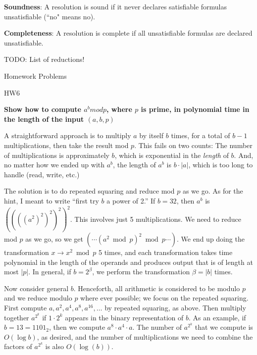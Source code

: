 \documentclass[2pt]{scrartcl}
\makeatletter
\renewcommand{\section}{\@startsection{section}{1}{0mm}
  {-1ex plus -.5ex minus -.2ex}
  {0.5ex plus .2ex}
{\normalfont\large\bfseries}}
\renewcommand{\subsection}{\@startsection{subsection}{2}{0mm}
  {-1explus -.5ex minus -.2ex}
  {0.5ex plus .2ex}
{\normalfont\normalsize\bfseries}}
\makeatother
\begin{document}
\begin{multicols}{6}
  {\bf Soundness}: A resolution is sound if it never declares satisfiable formulas unsatisfiable (``no" means no).

  {\bf Completeness}: A resolution is complete if all unsatisfiable formulas are declared unsatisfiable.

  TODO: List of reductions!

  \section{Homework Problems}

  \subsection{HW6}

  {\bf Show how to compute $a^b mod p$, where $p$ is prime, in polynomial time in the length of the input $(a, b, p)$}

  A straightforward approach is to multiply $a$ by itself $b$
  times, for a total of $b-1$ multiplications, then take the result mod
  $p$.  This fails on two counts:  The number of multiplications is
  approximately $b$, which is exponential in the {\em length} of $b$.
  And, no matter how we ended up with $a^b$, the length of $a^b$ is
  $b\cdot|a|$, which is too long to handle (read, write, etc.)

  The solution is to do repeated squaring and reduce mod $p$ as we go.
  As for the hint, I meant to write ``first try $b$ a power of 2.''  If
  $b=32$, then $a^b$ is $((((a^2)^2)^2)^2)^2$.  This involves just 5
  multiplications.  We need to reduce mod $p$ as we go, so we get
  $(\cdots(a^2\bmod p)^2\bmod p\cdots)$.  We end up doing the
  transformation $x\to x^2\bmod p$ 5 times, and each transformation
  takes time polynomial in the length of the operands and produces
  output that is of length at most $|p|$.  In general, if $b=2^\beta$,
  we perform the transformation $\beta=|b|$ times.

  Now consider general $b$.  Henceforth, all arithmetic is considered to
  be modulo $p$ and we reduce modulo $p$ where ever possible; we focus
  on the repeated squaring.  First compute $a,a^2,a^4,a^8,a^{16},\ldots$
  by repeated squaring, as above.  Then multiply together $a^{2^k}$ if
  $1\cdot 2^k$ appears in the binary representation of $b$.  As an
  example, if $b=13=1101_2$, then we compute $a^8\cdot a^4\cdot a$.  The
  number of $a^{2^k}$ that we compute is $O(\log b)$, as desired, and
  the number of multiplications we need to combine the factors of
  $a^{2^k}$ is also $O(\log(b))$.


\end{multicols}
\end{document}
